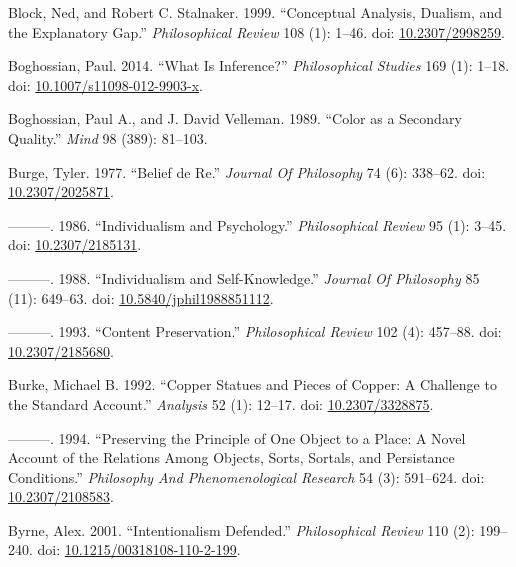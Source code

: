 \documentclass[
  10pt,
  letterpaper,
  DIV=11,
  numbers=noendperiod,
  twoside]{scrartcl}
\newlength{\cslhangindent}
\newenvironment{CSLReferences}[2] %
 {\begin{list}{}{%
  \setlength{\itemindent}{0pt}
  \setlength{\leftmargin}{0pt}
  \setlength{\parsep}{0pt}
  \ifodd #1
   \setlength{\leftmargin}{\cslhangindent}
   \setlength{\itemindent}{-1\cslhangindent}
  \fi
  \setlength{\itemsep}{#2\baselineskip}}}
 {\end{list}}
\begin{document}
\begin{CSLReferences}{1}{0}
Block, Ned, and Robert C. Stalnaker. 1999. {``Conceptual Analysis,
Dualism, and the Explanatory Gap.''} \emph{Philosophical Review} 108
(1): 1--46. doi:
\href{https://doi.org/10.2307/2998259}{10.2307/2998259}.

Boghossian, Paul. 2014. {``What Is Inference?''} \emph{Philosophical
Studies} 169 (1): 1--18. doi:
\href{https://doi.org/10.1007/s11098-012-9903-x}{10.1007/s11098-012-9903-x}.

Boghossian, Paul A., and J. David Velleman. 1989. {``Color as a
Secondary Quality.''} \emph{Mind} 98 (389): 81--103.

Burge, Tyler. 1977. {``Belief de Re.''} \emph{Journal Of Philosophy} 74
(6): 338--62. doi:
\href{https://doi.org/10.2307/2025871}{10.2307/2025871}.

---------. 1986. {``Individualism and Psychology.''} \emph{Philosophical
Review} 95 (1): 3--45. doi:
\href{https://doi.org/10.2307/2185131}{10.2307/2185131}.

---------. 1988. {``Individualism and Self-Knowledge.''} \emph{Journal
Of Philosophy} 85 (11): 649--63. doi:
\href{https://doi.org/10.5840/jphil1988851112}{10.5840/jphil1988851112}.

---------. 1993. {``Content Preservation.''} \emph{Philosophical Review}
102 (4): 457--88. doi:
\href{https://doi.org/10.2307/2185680}{10.2307/2185680}.

Burke, Michael B. 1992. {``Copper Statues and Pieces of Copper: A
Challenge to the Standard Account.''} \emph{Analysis} 52 (1): 12--17.
doi: \href{https://doi.org/10.2307/3328875}{10.2307/3328875}.

---------. 1994. {``Preserving the Principle of One Object to a Place: A
Novel Account of the Relations Among Objects, Sorts, Sortals, and
Persistance Conditions.''} \emph{Philosophy And Phenomenological
Research} 54 (3): 591--624. doi:
\href{https://doi.org/10.2307/2108583}{10.2307/2108583}.

Byrne, Alex. 2001. {``Intentionalism Defended.''} \emph{Philosophical
Review} 110 (2): 199--240. doi:
\href{https://doi.org/10.1215/00318108-110-2-199}{10.1215/00318108-110-2-199}.


\end{CSLReferences}
\end{document}
